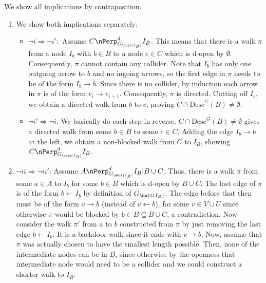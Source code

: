 \begin{enumerate}[label=8.\arabic*]
    \begin{ungradedsolution}
        We show all implications by contraposition.
        \begin{enumerate}
            \item We show both implications separately:
            \begin{itemize}
                \item $\neg i \Rightarrow \neg i':$ Assume $C \nPerp^d_{G_{\doit(I_B)}} I_B$.
                This means that there is a walk $\pi$ from a node $I_b$ with $b \in B$ to a node $c \in C$ which is d-open by $\emptyset$.
                Consequently, $\pi$ cannot contain any collider.
                Note that $I_b$ has only one outgoing arrow to $b$ and no ingoing arrows, so the first edge in $\pi$ needs to be of the form $I_b \to b$.
                Since there is no collider, by induction each arrow in $\pi$ is of the form $v_i \rightarrow v_{i+1}$.
                Consequently, $\pi$ is directed.
                Cutting off $I_b$, we obtain a directed walk from $b$ to $c$, proving $C \cap \text{Desc}^G(B) \neq \emptyset$.
                \item $\neg i' \Rightarrow \neg i$: We basically do each step in reverse.
                $C \cap \text{Desc}^G(B) \neq \emptyset$ gives a directed walk from some $b \in B$ to some $c \in C$.
                Adding the edge $I_b \to b$ at the left, we obtain a non-blocked walk from $C$ to $I_B$, showing $C \nPerp^d_{G_{\doit(I_B)}} I_B$.
            \end{itemize}
            \item $\neg ii \Rightarrow \neg ii'$: Assume $A \nPerp^d_{G_{\doit(I_B)}} I_B | B \cup C$.
            Thus, there is a walk $\pi$ from some $a \in A$ to $I_b$ for some $b \in B$ which is d-open by $B \cup C$.
            The last edge of $\pi$ is of the form $b \leftarrow I_b$ by definition of $G_{\doit(I_B)}$.
            The edge before that then must be of the form $v \rightarrow b$ (instead of $v \leftarrow b$), for some $v \in V \cup U$ since otherwise $\pi$ would be blocked by $b \in B \subseteq B \cup C$, a contradiction.
            Now consider the walk $\pi'$ from $a$ to $b$ constructed from $\pi$ by just removing the last edge $b \leftarrow I_b$.
            It is a backdoor-walk since it ends with $v \rightarrow b$.
            Now, assume that $\pi$ was actually chosen to have the smallest length possible.
            Then, none of the intermediate nodes can be in $B$, since otherwise by the openness that intermediate node would need to be a collider and we could construct a shorter walk to $I_B$.

\end{enumerate}
\end{ungradedsolution}
\end{enumerate}
